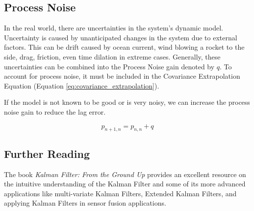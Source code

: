 \subsection{Process Noise} In the real world, there are uncertainties in the system's dynamic model.
Uncertainty is caused by unanticipated changes in the system due to external factors.
This can be drift caused by ocean current, wind blowing a rocket to the side, drag, friction, even time dilation in extreme cases.
Generally, these uncertainties can be combined into the Process Noise gain denoted by $q$.
To account for process noise, it must be included in the Covariance Extrapolation Equation (Equation \ref{eq:covariance_extrapolation}).

If the model is not known to be good or is very noisy, we can increase the process noise gain to reduce the lag error.

\begin{equation}
    p_{n+1,n} = p_{n,n} + q
\end{equation}

\subsection*{Further Reading}
The book \textit{Kalman Filter: From the Ground Up} \cite{Becker:2023} provides an excellent resource on the intuitive understanding of the Kalman Filter and some of its more advanced applications like multi-variate Kalman Filters, Extended Kalman Filters, and applying Kalman Filters in sensor fusion applications.